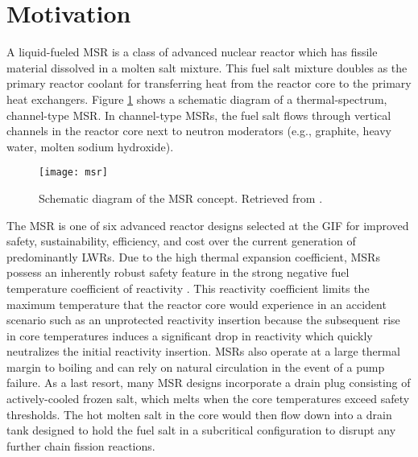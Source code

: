 \section{Motivation}

A liquid-fueled \gls{MSR} is a class of advanced nuclear reactor which has fissile material
dissolved in a molten salt mixture. This fuel salt mixture doubles as the primary reactor coolant
for transferring heat from the reactor core to the primary heat exchangers. Figure \ref{fig:msr}
shows a schematic diagram of a thermal-spectrum, channel-type \gls{MSR}. In channel-type
\glspl{MSR}, the fuel salt flows through vertical channels in the reactor core next to neutron
moderators (e.g., graphite, heavy water, molten sodium hydroxide). 
%
\begin{figure}[htb!]
	\centering
	\texttt{[image: msr]}
	\caption{Schematic diagram of the \gls{MSR} concept. Retrieved from
	\cite{doe_technology_2002}.}
	\label{fig:msr}
\end{figure}

The \gls{MSR} is one of six advanced reactor designs selected at the \gls{GIF} for improved safety,
sustainability, efficiency, and cost over the current generation of predominantly \glspl{LWR}.
Due to the high thermal expansion coefficient, \glspl{MSR} possess an inherently robust
safety feature in the strong negative fuel temperature coefficient of
reactivity \cite{elsheikh_safety_2013}. This reactivity coefficient limits the
maximum temperature that the reactor core would experience in an accident
scenario such as an unprotected reactivity insertion because the subsequent
rise in core temperatures induces a significant drop in reactivity which
quickly neutralizes the initial reactivity insertion. \glspl{MSR} also
operate at a large thermal margin to boiling and can rely on natural
circulation in the event of a pump failure. As a last resort, many \gls{MSR}
designs incorporate a drain plug consisting of actively-cooled frozen salt, which
melts when the core temperatures exceed safety thresholds. The hot molten salt
in the core would then flow down into a drain tank designed to hold the fuel salt in
a subcritical configuration to disrupt any further chain fission reactions.

